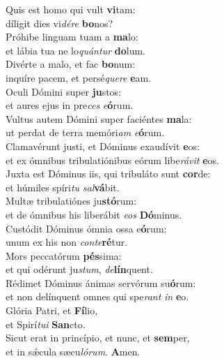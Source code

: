 \evenverse Quis est homo qui vult \textbf{vi}tam:~\*\\
\evenverse díligit dies vi\textit{dé}\textit{re} \textbf{bo}nos?\\
\oddverse Próhibe linguam tuam a \textbf{ma}lo:~\*\\
\oddverse et lábia tua ne lo\textit{quán}\textit{tur} \textbf{do}lum.\\
\evenverse Divérte a malo, et fac \textbf{bo}num:~\*\\
\evenverse inquíre pacem, et persé\textit{que}\textit{re} \textbf{e}am.\\
\oddverse Oculi Dómini super \textbf{ju}stos:~\*\\
\oddverse et aures ejus in pre\textit{ces} \textit{e}\textbf{ó}rum.\\
\evenverse Vultus autem Dómini super faciéntes \textbf{ma}la:~\*\\
\evenverse ut perdat de terra memóri\textit{am} \textit{e}\textbf{ó}rum.\\
\oddverse Clamavérunt justi, et Dóminus exaudívit \textbf{e}os:~\*\\
\oddverse et ex ómnibus tribulatiónibus eórum libe\textit{rá}\textit{vit} \textbf{e}os.\\
\evenverse Juxta est Dóminus iis, qui tribuláto sunt \textbf{cor}de:~\*\\
\evenverse et húmiles spíri\textit{tu} \textit{sal}\textbf{vá}bit.\\
\oddverse Multæ tribulatiónes ju\textbf{stó}rum:~\*\\
\oddverse et de ómnibus his liberábit \textit{e}\textit{os} \textbf{Dó}minus.\\
\evenverse Custódit Dóminus ómnia ossa e\textbf{ó}rum:~\*\\
\evenverse unum ex his non \textit{con}\textit{te}\textbf{ré}tur.\\
\oddverse Mors peccatórum \textbf{pés}sima:~\*\\
\oddverse et qui odérunt ju\textit{stum}, \textit{de}\textbf{lín}quent.\\
\evenverse Rédimet Dóminus ánimas servórum su\textbf{ó}rum:~\*\\
\evenverse et non delínquent omnes qui spe\textit{rant} \textit{in} \textbf{e}o.\\
\oddverse Glória Patri, et \textbf{Fí}lio,~\*\\
\oddverse et Spirí\textit{tu}\textit{i} \textbf{San}cto.\\
\evenverse Sicut erat in princípio, et nunc, et \textbf{sem}per,~\*\\
\evenverse et in sǽcula sæcu\textit{ló}\textit{rum}. \textbf{A}men.\\
